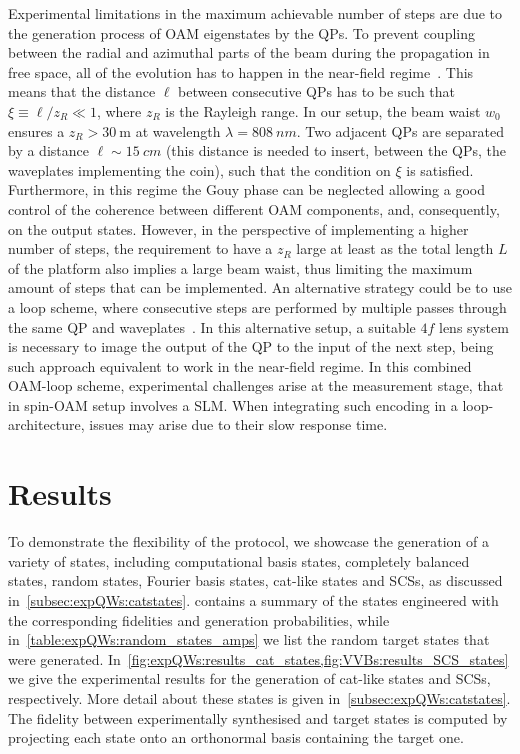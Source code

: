 Experimental limitations in the maximum achievable number of steps are due to the generation process of \ac{OAM} eigenstates by the \acp{QP}. To prevent coupling between the radial and azimuthal parts of the beam during the propagation in free space, all of the evolution has to happen in the near-field regime~\cite{karimi2009light,cardano2015quantum}. This means that the distance $\ell$ between consecutive \acp{QP} has to be such that $\xi\equiv \ell/z_R \ll 1 $, where $z_R$ is the Rayleigh range.
In our setup, the beam waist $w_0$  ensures a $z_R> \SI{30}{\meter}$ at wavelength $\lambda=\SI{808}{nm}$. Two adjacent \acp{QP} are separated by a distance $\ell \sim \SI{15}{cm}$ (this distance is needed to insert, between the \acp{QP}, the waveplates implementing the coin), such that the condition on $\xi$ is satisfied.  Furthermore, in this regime the Gouy phase can be neglected allowing a good control of the coherence between different \ac{OAM} components, and, consequently, on the output states. However, in the perspective of implementing a higher number of steps, the requirement to have a $z_R$ large at least as the total length $L$ of the platform also implies a large beam waist, thus limiting the maximum amount of steps that can be implemented. An alternative strategy could be to use a loop scheme, where consecutive steps are performed by multiple passes through the same \ac{QP} and waveplates~\cite{goyal2013implementing}. In this alternative setup, a suitable $4f$ lens system is necessary to image the output of the QP to the input of the next step, being such approach equivalent to work in the near-field regime.  
In this combined \ac{OAM}-loop scheme, experimental challenges arise at the measurement stage, that in spin-\ac{OAM} setup involves a \ac{SLM}. When integrating such encoding in a loop-architecture, issues may arise due to their slow response time.


\section{Results}
\label{sec:expQWs:results}

To demonstrate the flexibility of the protocol, we showcase the generation of a variety of states, including computational basis states, completely balanced states, random states, Fourier basis states, cat-like states and \acp{SCS}, as discussed in~\cref{subsec:expQWs:catstates}.
 contains a summary of the states engineered with the corresponding fidelities and generation probabilities,
while in~\cref{table:expQWs:random_states_amps} we list the random target states that were generated.
In~\cref{fig:expQWs:results_cat_states,fig:VVBs:results_SCS_states} we give the experimental results for the generation of cat-like states and \acp{SCS}, respectively. More detail about these states is given in~\cref{subsec:expQWs:catstates}.
The fidelity between experimentally synthesised and target states is computed by projecting each state onto an orthonormal basis containing the target one.

